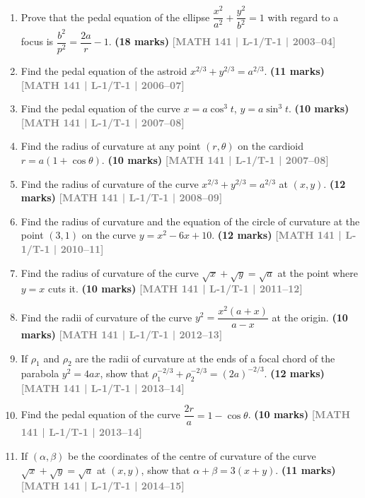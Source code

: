 \documentclass[12pt,a4paper]{article}
\newcommand{\yr}[1]{\hfill\textcolor{gray}{\small\textbf{[#1]}}}
\newcommand{\mk}[1]{\textcolor{orange!70!black}{\small\textbf{(#1 marks)}}}
\begin{document}
\begin{enumerate}

\item Prove that the pedal equation of the ellipse $\dfrac{x^{2}}{a^{2}}+\dfrac{y^{2}}{b^{2}}=1$ with regard to a focus is $\dfrac{b^{2}}{p^{2}}=\dfrac{2a}{r}-1$.
\mk{18} \yr{MATH 141 | L-1/T-1 | 2003--04}


\item Find the pedal equation of the astroid $x^{2/3}+y^{2/3}=a^{2/3}$.
\mk{11} \yr{MATH 141 | L-1/T-1 | 2006--07}

\item Find the pedal equation of the curve $x=a\cos^{3}t$, $y=a\sin^{3}t$.
\mk{10} \yr{MATH 141 | L-1/T-1 | 2007--08}

\item Find the radius of curvature at any point $(r,\theta)$ on the cardioid $r=a(1+\cos\theta)$.
\mk{10} \yr{MATH 141 | L-1/T-1 | 2007--08}

\item Find the radius of curvature of the curve $x^{2/3}+y^{2/3}=a^{2/3}$ at $(x,y)$.
\mk{12} \yr{MATH 141 | L-1/T-1 | 2008--09}

\item Find the radius of curvature and the equation of the circle of curvature at the point $(3,1)$ on the curve $y=x^{2}-6x+10$.
\mk{12} \yr{MATH 141 | L-1/T-1 | 2010--11}

\item Find the radius of curvature of the curve $\sqrt{x}+\sqrt{y}=\sqrt{a}$ at the point where $y=x$ cuts it.
\mk{10} \yr{MATH 141 | L-1/T-1 | 2011--12}

\item Find the radii of curvature of the curve $y^{2}=\dfrac{x^{2}(a+x)}{a-x}$ at the origin.
\mk{10} \yr{MATH 141 | L-1/T-1 | 2012--13}

\item If $\rho_{1}$ and $\rho_{2}$ are the radii of curvature at the ends of a focal chord of the parabola $y^{2}=4ax$, show that $\rho_{1}^{-2/3}+\rho_{2}^{-2/3}=(2a)^{-2/3}$.
\mk{12} \yr{MATH 141 | L-1/T-1 | 2013--14}

\item Find the pedal equation of the curve $\dfrac{2r}{a}=1-\cos\theta$.
\mk{10} \yr{MATH 141 | L-1/T-1 | 2013--14}

\item If $(\alpha,\beta)$ be the coordinates of the centre of curvature of the curve $\sqrt{x}+\sqrt{y}=\sqrt{a}$ at $(x,y)$, show that $\alpha+\beta=3(x+y)$.
\mk{11} \yr{MATH 141 | L-1/T-1 | 2014--15}


\end{enumerate}
\end{document}
